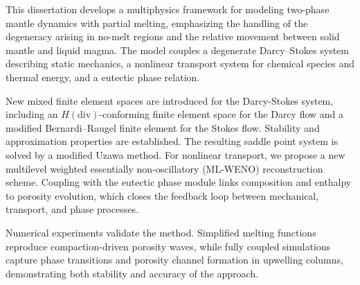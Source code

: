 This dissertation develops a multiphysics framework for modeling two-phase mantle dynamics with partial melting, 
emphasizing the handling of the degeneracy arising in no-melt regions and the relative movement between solid mantle and liquid magma. 
The model couples a degenerate Darcy–Stokes system describing static mechanics, a nonlinear transport system for 
chemical species and thermal energy, and a eutectic phase relation.

New mixed finite element spaces are introduced for the Darcy-Stokes system, including an $H(\text{div})$-conforming finite element space 
for the Darcy flow and a 
modified Bernardi–Raugel finite element for the Stokes flow. Stability and approximation properties are established. The resulting saddle point system 
is solved by a modified Uzawa method. For nonlinear transport, we propose a new multilevel weighted essentially non-oscillatory (ML-WENO) reconstruction
scheme.
Coupling with the eutectic phase module links composition and enthalpy to porosity evolution, which closes the feedback loop between mechanical, transport,
and phase processes.

Numerical experiments validate the method. Simplified melting functions reproduce compaction-driven porosity waves, while fully coupled simulations capture 
phase transitions and porosity channel formation in upwelling columns, demonstrating both stability and accuracy of the approach.
